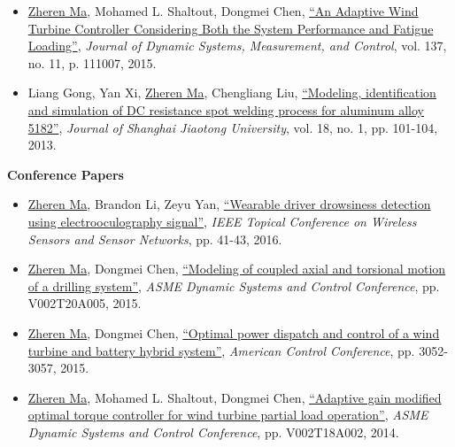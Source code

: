 \documentclass[margin, 9pt]{res} %
\begin{document}
\begin{resume}
\begin{itemize}[leftmargin=*]
\item \underline{Zheren Ma}, Mohamed L. Shaltout, Dongmei Chen, 
          \href{http://dynamicsystems.asmedigitalcollection.asme.org/article.aspx?articleid=2468735}
          {``An Adaptive Wind Turbine Controller Considering Both the System Performance and Fatigue Loading''}, 
          \textit{Journal of Dynamic Systems, Measurement, and Control}, vol. 137, no. 11, p. 111007, 2015.

\item Liang Gong, Yan Xi, \underline{Zheren Ma}, Chengliang Liu, 
          \href{http://link.springer.com/article/10.1007\%2Fs12204-013-1371-8}
          {``Modeling, identification and simulation of DC resistance spot welding process for aluminum alloy 5182''}, 
          \textit{Journal of Shanghai Jiaotong University}, vol. 18, no. 1, pp. 101-104, 2013.
\end{itemize}

{\large\textbf{Conference Papers}}
\begin{itemize}[leftmargin=*] \itemsep 0pt
    \item \underline{Zheren Ma}, Brandon Li, Zeyu Yan,
         \href{http://ieeexplore.ieee.org/xpl/login.jsp?tp=&arnumber=7444317&url=http\%3A\%2F\%2Fieeexplore.ieee.org\%2Fxpls\%2Fabs_all.jsp\%3Farnumber\%3D7444317}
          {``Wearable driver drowsiness detection using electrooculography signal''}, 
          \textit{IEEE Topical Conference on Wireless Sensors and Sensor Networks}, pp. 41-43, 2016.

	\item \underline{Zheren Ma}, Dongmei Chen, 
          \href{http://proceedings.asmedigitalcollection.asme.org/proceeding.aspx?articleid=2481922}{``Modeling of coupled axial and torsional motion of a drilling system''}, 
          \textit{ASME Dynamic Systems and Control Conference}, pp. V002T20A005, 2015.

	\item \underline{Zheren Ma},  Dongmei Chen, 
          \href{http://ieeexplore.ieee.org/xpl/login.jsp?tp=&arnumber=7171801&url=http\%3A\%2F\%2Fieeexplore.ieee.org\%2Fxpls\%2Fabs_all.jsp\%3Farnumber\%3D7171801}
          {``Optimal power dispatch and control of a wind turbine and battery hybrid system''}, 
          \textit{American Control Conference}, pp. 3052-3057, 2015.

	\item \underline{Zheren Ma}, Mohamed L. Shaltout, Dongmei Chen, 
          \href{http://proceedings.asmedigitalcollection.asme.org/proceeding.aspx?articleid=2086149}
          {``Adaptive gain modified optimal torque controller for wind turbine partial load operation''}, 
          \textit{ASME Dynamic Systems and Control Conference}, pp. V002T18A002, 2014.


\end{itemize}
\end{resume}
\end{document}
